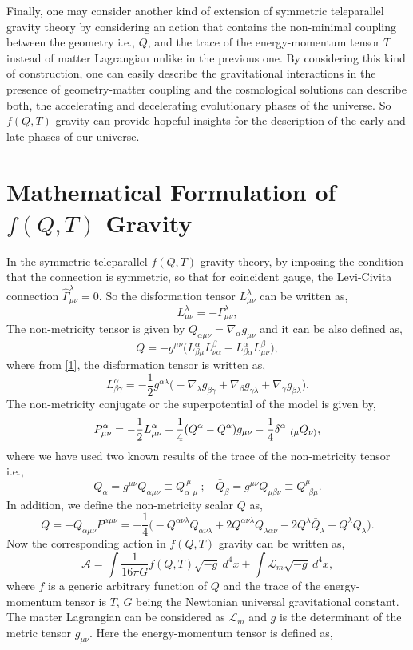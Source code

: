 \documentclass[showpacs,aps,amssymb,preprintnumbers,prd,amsmath,floatfix]{revtex4}
\def \m{\mu}
\def \n{\nu}
\def \a{\alpha}
\def \b{\beta}
\def \g{\gamma}
\def \d{\delta}
\def \l{\lambda}
\def \s{\sqrt}
\def \be{\begin{equation}}
\def \ee{\end{equation}}
\def \nb{\nabla}
\def \L{\mathcal{L}_m}
\def \A{\mathcal{A}}
\def \G{\Gamma}
\begin{document}
Finally, one may consider another kind of extension of symmetric teleparallel gravity theory by considering an action that contains the non-minimal coupling between the geometry i.e., $Q$, and the trace of the energy-momentum tensor $T$ instead of matter Lagrangian unlike in the previous one. By considering this kind of construction, one can easily describe the gravitational interactions in the presence of geometry-matter coupling and the cosmological solutions can describe both, the accelerating and decelerating evolutionary phases of the universe. So $f(Q,T)$ gravity can provide hopeful insights for the description of the early and late phases of our universe.






\section{Mathematical Formulation of $f(Q,T)$ Gravity}\label{III}
In the symmetric teleparallel $f(Q,T)$ gravity theory, by imposing the condition that the connection is symmetric, so that for coincident gauge, the Levi-Civita connection $\hat{\G}^\l_{\m\n}=0$. So the disformation tensor $L^\l_{\m\n}$ can be written as,
\be
L^\l_{\m\n}=-\G^\l_{\m\n}\label{1},
\ee
The non-metricity tensor is given by $Q_{\a\m\n}=\nb_\a g_{\m\n}$ and it can be also defined as,
\be
Q=-g^{\m\n}\Big(L^\a_{\b\m}L^\b_{\n\a}-L^\a_{\b\a}L^\b_{\m\n}\Big)\label{2},
\ee
where from \eqref{1}, the disformation tensor is written as,
\be
L^\a_{\b\g}=-\frac{1}{2}g^{\a\l}\Big(-\nb_\l g_{\b\g}+\nb_\b g_{\g\l}+\nb_\g g_{\b\l}\Big).\label{3}
\ee
The non-metricity conjugate or the superpotential of the model is given by,
\be
P^\a_{\m\n}=-\frac{1}{2}L^\a_{\m\n}+\frac{1}{4}(Q^\a-\Bar{Q}^\a)g_{\m\n}-\frac{1}{4}\d^\a~_{(\m}Q_{\n)},\label{4}
\ee
where we have used two known results of the trace of the non-metricity tensor i.e.,
\be
Q_\a=g^{\m\n}Q_{\a\m\n}\equiv Q^{~\m~}_{\a~~\m}~;~~~~
\bar{Q}_\b=g^{\m\n}Q_{\m\b\n}\equiv Q^{\m}_{~~\b\m}.\label{5}
\ee
In addition, we define the non-metricity scalar $Q$ as,
\be
Q=-Q_{\a\m\n}P^{\a\m\n}=-\frac{1}{4}\Big(-Q^{\a\n\l} Q_{\a\n\l}+2 Q^{\a\n\l}Q_{\l\a\n}
-2 Q^\l\bar{Q}_\l+Q^\l Q_\l\Big).\label{6}  
\ee
Now the corresponding action in $f(Q,T)$ gravity can be written as,
\be
\A=\int \frac{1}{16\pi G}f(Q,T)\s{-g}~d^4x+\int \L\s{-g}~d^4x\label{7},
\ee
where $f$ is a generic arbitrary function of $Q$ and the trace of the energy-momentum tensor is $T$, $G$ being the Newtonian universal gravitational constant. The matter Lagrangian can be considered as $\L$ and $g$ is the determinant of the metric tensor $g_{\m\n}$. Here the energy-momentum tensor is defined as,
\end{document}
